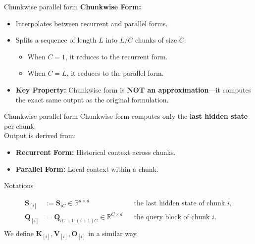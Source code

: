 \begin{frame}{Chunkwise parallel form}
    \textbf{Chunkwise Form:}
    \begin{itemize}
        \item Interpolates between recurrent and parallel forms.
        \item Splits a sequence of length $L$ into $L/C$ chunks of size $C$:
            \begin{itemize}
                \item When $C=1$, it reduces to the recurrent form.
                \item When $C=L$, it reduces to the parallel form.
            \end{itemize}
        \item  \textbf{Key Property:} Chunkwise form is {\color{red} \textbf{NOT an approximation}}—it computes the exact same output as the original formulation.
        \end{itemize}
\end{frame}

\begin{frame}{Chunkwise parallel form}
    Chunkwise form computes only the {\color{red} \textbf{last hidden state}} per chunk. 
    \\
    Output is derived from:
                \begin{itemize}
                \item {\color{red} \textbf{Recurrent Form:}} Historical context across chunks.
                \item {\color{red} \textbf{Parallel Form:}} Local context within a chunk.
            \end{itemize}
\end{frame}

\begin{frame}{Notations}
 
    \begin{align*}
        \mathbf{S}_{[i]} &:= \mathbf{S}_{iC} \in \mathbb{R}^{d \times d} &&\text{the last hidden state of chunk $i$}, \\
        \mathbf{Q}_{[i]} &= \mathbf{Q}_{iC+1:(i+1)C} \in \mathbb{R}^{C \times d} &&\text{the query block of chunk $i$}. \\
    \end{align*}
    We define $\mathbf{K}_{[i]}, \mathbf{V}_{[i]}, \mathbf{O}_{[i]}$ in a similar way.
\end{frame}



